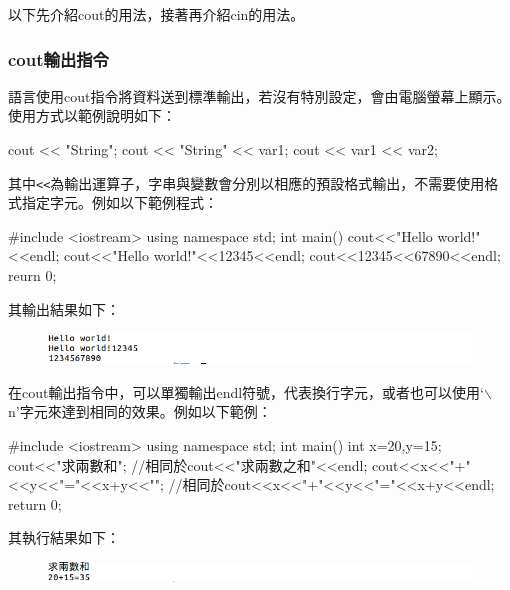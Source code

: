 以下先介紹cout的用法，接著再介紹cin的用法。

\subsubsection{cout輸出指令}
\cc{}語言使用cout指令將資料送到標準輸出，若沒有特別設定，會由電腦螢幕上顯示。使用方式以範例說明如下：
\begin{inside}
	cout << "String";
	cout << "String" << var1;
	cout << var1 << var2;
\end{inside}
其中\texttt{<<}為輸出運算子，字串與變數會分別以相應的預設格式輸出，不需要使用格式指定字元。例如以下範例程式：
 \begin{cppcode}
 	#include <iostream>
 	using namespace std;
 	int main()
 	{
 		cout<<"Hello world!"<<endl;
 	    cout<<"Hello world!"<<12345<<endl;
 		cout<<12345<<67890<<endl;
 		reurn 0;
 	}
 \end{cppcode}
其輸出結果如下：
 \begin{figure}[H]
 	\centering
	\includegraphics[width=18cm]{fig/cpp_io/HW002}
 \end{figure}
在cout輸出指令中，可以單獨輸出endl符號，代表換行字元，或者也可以使用`$\backslash$n'字元來達到相同的效果。例如以下範例：
\begin{cppcode}
	#include <iostream>
	using namespace std;
	int main()
	{
		int x=20,y=15;
		cout<<"求兩數和\n";  
		//相同於cout<<"求兩數之和"<<endl;
		cout<<x<<"+"<<y<<"="<<x+y<<"\n";
		//相同於cout<<x<<"+"<<y<<"="<<x+y<<endl;
		return 0;
}	
\end{cppcode}
其執行結果如下：
\begin{figure}[H]
\centering
	\includegraphics[width=17cm]{fig/cpp_io/HW-003}
\end{figure}


